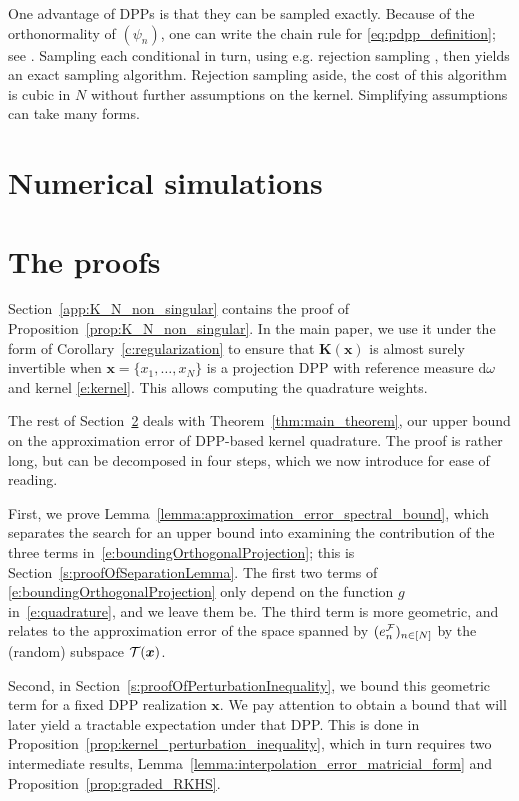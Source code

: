\documentclass[twoside,11pt]{book}
\begin{document}
\clearpage



One advantage of DPPs is that they can be sampled exactly. Because of the orthonormality of $(\psi_n)$, one can write the chain rule for \eqref{eq:pdpp_definition}; see \cite{HKPV06}. Sampling each conditional in turn, using e.g. rejection sampling \cite{RoCa04}, then yields an exact sampling algorithm. Rejection sampling aside, the cost of this algorithm is cubic in $N$ without further assumptions on the kernel. Simplifying assumptions can take many forms. 

\section{Numerical simulations}

\section{The proofs}
\label{s:proofs}
Section~\ref{app:K_N_non_singular} contains the proof of Proposition~\ref{prop:K_N_non_singular}. In the main paper, we use it under the form of Corollary~\ref{c:regularization} to ensure that $\bm{K}(\bm{x})$ is almost surely invertible when $\bm{x} = \{x_{1}, \dots , x_{N}\}$ is a projection DPP with reference measure $\mathrm{d}\omega$ and kernel \eqref{e:kernel}. This allows computing the quadrature weights.

The rest of Section~\ref{s:proofs} deals with Theorem~\ref{thm:main_theorem}, our upper bound on the approximation error of DPP-based kernel quadrature. The proof is rather long, but can be decomposed in four steps, which we now introduce for ease of reading.

First, we prove Lemma~\ref{lemma:approximation_error_spectral_bound}, which separates the search for an upper bound into examining the contribution of the three terms in~\eqref{e:boundingOrthogonalProjection}; this is Section~\ref{s:proofOfSeparationLemma}. The first two terms of \eqref{e:boundingOrthogonalProjection} only depend on the function $g$ in~\eqref{e:quadrature}, and we leave them be. The third term is more geometric, and relates to the approximation error of the space spanned by $(e^{\cal F}_n)_{n\in[N]}$ by the (random) subspace ${\cal T}(\bm{x})$.

Second, in Section~\ref{s:proofOfPerturbationInequality}, we bound this geometric term for a fixed DPP realization $\bm{x}$. We pay attention to obtain a bound that will later yield a tractable expectation under that DPP. This is done in Proposition~\ref{prop:kernel_perturbation_inequality}, which in turn requires two intermediate results, Lemma~\ref{lemma:interpolation_error_matricial_form} and Proposition~\ref{prop:graded_RKHS}.
\end{document}
